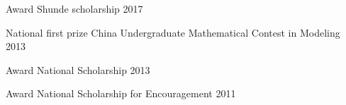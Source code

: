 \begin{cvhonors}

  \cvhonor
    {Award} %
    {Shunde scholarship} %
    {} %
    {2017} %
    

  \cvhonor
    {National first prize} %
    {China Undergraduate Mathematical Contest in Modeling} %
    {} %
    {2013} %

  \cvhonor
     {Award}
     {National Scholarship}
     {}
     {2013}

  \cvhonor
     {Award}
     {National Scholarship for Encouragement }
     {}
     {2011}


\end{cvhonors}
